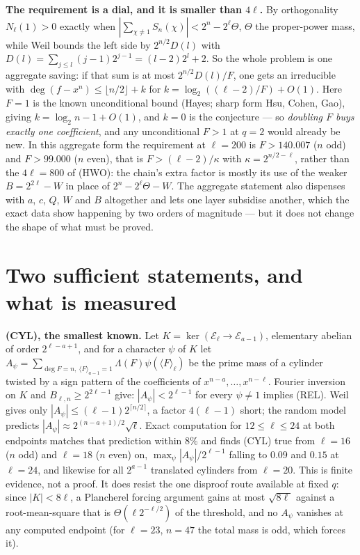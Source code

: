 \documentclass[10pt]{article}
\newcommand{\E}{\mathcal E}
\begin{document}
\textbf{The requirement is a dial, and it is smaller than $4\ell$.} By
orthogonality $N_\ell(1)>0$ exactly when
$|\sum_{\chi\neq1}S_n(\chi)|<2^n-2^\ell\Theta$, $\Theta$ the proper-power mass,
while Weil bounds the left side by $2^{n/2}D(l)$ with
$D(l)=\sum_{j\le l}(j-1)2^{j-1}=(l-2)2^l+2$. So the whole problem is one
aggregate saving: if that sum is at most $2^{n/2}D(l)/F$, one gets an
irreducible with $\deg(f-x^n)\le\lfloor n/2\rfloor+k$ for
$k=\log_2((\ell-2)/F)+O(1)$. Here $F=1$ is the known unconditional bound
(Hayes; sharp form Hsu, Cohen, Gao), giving $k=\log_2 n-1+O(1)$, and $k=0$ is
the conjecture --- so \emph{doubling $F$ buys exactly one coefficient}, and any
unconditional $F>1$ at $q=2$ would already be new. In this aggregate form the
requirement at $\ell=200$ is $F>140.007$ ($n$ odd) and $F>99.000$ ($n$ even),
that is $F>(\ell-2)/\kappa$ with $\kappa=2^{n/2-\ell}$, rather than the
$4\ell=800$ of (HWO): the chain's extra factor is mostly its use of the weaker
$B=2^{2\ell}-W$ in place of $2^n-2^\ell\Theta-W$. The aggregate statement also
dispenses with $a$, $c$, $Q$, $W$ and $B$ altogether and lets one layer
subsidise another, which the exact data show happening by two orders of
magnitude --- but it does not change the shape of what must be proved.

\section{Two sufficient statements, and what is measured}

\textbf{(CYL), the smallest known.} Let $K=\ker(\E_\ell\to\E_{a-1})$,
elementary abelian of order $2^{\ell-a+1}$, and for a character $\psi$ of $K$
let $A_\psi=\sum_{\deg F=n,\ \langle F\rangle_{a-1}=1}\Lambda(F)\psi(\langle
F\rangle_\ell)$ be the prime mass of a cylinder twisted by a sign pattern of
the coefficients of $x^{n-a},\dots,x^{n-\ell}$. Fourier inversion on $K$ and
$B_{\ell,n}\geq2^{2\ell-1}$ give: $|A_\psi|<2^{\ell-1}$ for every
$\psi\neq1$ implies (REL). Weil gives only
$|A_\psi|\leq(\ell-1)2^{\lceil n/2\rceil}$, a factor $4(\ell-1)$ short; the
random model predicts $|A_\psi|\approx2^{(n-a+1)/2}\sqrt\ell$. Exact
computation for $12\leq\ell\leq24$ at both endpoints matches that prediction
within $8\%$ and finds (CYL) true from $\ell=16$ ($n$ odd) and $\ell=18$ ($n$
even) on, $\max_\psi|A_\psi|/2^{\ell-1}$ falling to $0.09$ and $0.15$ at
$\ell=24$, and likewise for all $2^{a-1}$ translated cylinders from
$\ell=20$. This is finite evidence, not a proof. It does resist the one
disproof route available at fixed $q$: since $|K|<8\ell$, a Plancherel
forcing argument gains at most $\sqrt{8\ell}$ against a root-mean-square that
is $\Theta(\ell2^{-\ell/2})$ of the threshold, and no $A_\psi$ vanishes at any
computed endpoint (for $\ell=23$, $n=47$ the total mass is odd, which forces
it).
\end{document}
